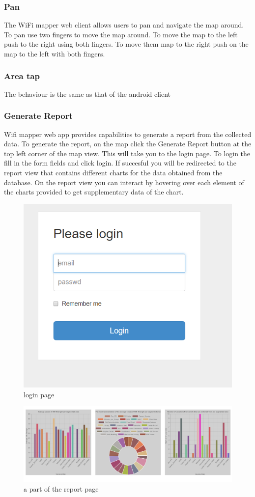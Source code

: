 \subsubsection{Pan}
The WiFi mapper web client allows users to pan and navigate the map around. To pan use two fingers to move the map around. To move the map to the left push to the right using both fingers. To move them map to the right push on the map to the left with both fingers.

\subsubsection{Area tap}
The behaviour is the same as that of the android client


\subsubsection{Generate Report}
Wifi mapper web app provides capabilities to generate a report from the collected data. To generate the report, on the map click the Generate Report button at the top left corner of the map view. This will take you to the login page. To login the fill in the form fields and click login. If succesful you will be redirected to the report view that contains different charts for the data obtained from the database. On the report view you can interact by hovering over each element of the charts provided to get supplementary data of the chart.

\begin{figure}
	\centering
	\includegraphics[width=0.7\linewidth]{images_manual/login}
	\caption{login page}
	\label{fig:login}
\end{figure}

\begin{figure}
	\centering
	\includegraphics[width=0.7\linewidth]{images_manual/report}
	\caption{a part of the report page}
	\label{fig:report}
\end{figure}


